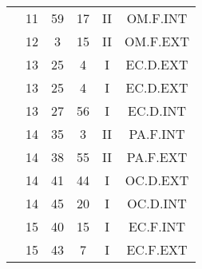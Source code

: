 \documentclass[12pt, a4paper]{article}
\begin{document}
\begin{multicols}{3}
{\begin{tabular}{c c c c c c}
	 	 	 	 & 11 & 59 & 17 & II & OM.F.INT\\%
	 	 	 	 & 12 & 3 & 15 & II & OM.F.EXT\\%
	 	 	 	 & 13 & 25 & 4 & I & EC.D.EXT\\%
	 	 	 	 & 13 & 25 & 4 & I & EC.D.EXT\\%
	 	 	 	 & 13 & 27 & 56 & I & EC.D.INT\\%
	 	 	 	 & 14 & 35 & 3 & II & PA.F.INT\\%
	 	 	 	 & 14 & 38 & 55 & II & PA.F.EXT\\%
	 	 	 	 & 14 & 41 & 44 & I & OC.D.EXT\\%
	 	 	 	 & 14 & 45 & 20 & I & OC.D.INT\\%
	 	 	 	 & 15 & 40 & 15 & I & EC.F.INT\\%
	 	 	 	 & 15 & 43 & 7 & I & EC.F.EXT\\%
	 	 \end{tabular}
 	}
\end{multicols}
\end{document}
